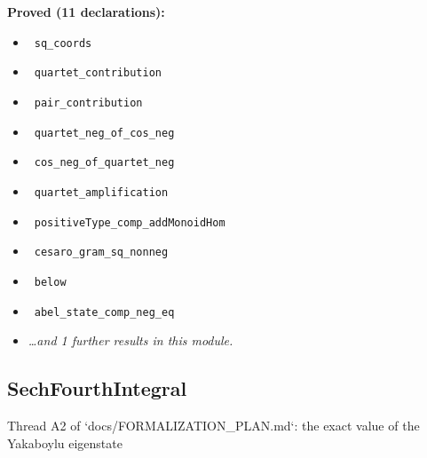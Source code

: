 \documentclass{report}
\theoremstyle{definition}
\begin{document}
\noindent\textbf{Proved (11 declarations):}
\begin{itemize}
  \item {}\leanok\ \texttt{sq\_coords}
  \item {}\leanok\ \texttt{quartet\_contribution}
  \item {}\leanok\ \texttt{pair\_contribution}
  \item {}\leanok\ \texttt{quartet\_neg\_of\_cos\_neg}
  \item {}\leanok\ \texttt{cos\_neg\_of\_quartet\_neg}
  \item {}\leanok\ \texttt{quartet\_amplification}
  \item {}\leanok\ \texttt{positiveType\_comp\_addMonoidHom}
  \item {}\leanok\ \texttt{cesaro\_gram\_sq\_nonneg}
  \item {}\leanok\ \texttt{below}
  \item {}\leanok\ \texttt{abel\_state\_comp\_neg\_eq}
  \item \emph{\ldots and 1 further results in this module.}
\end{itemize}

\subsection{SechFourthIntegral}
Thread A2 of `docs/FORMALIZATION\_PLAN.md`: the exact value of the Yakaboylu eigenstate
\end{document}

